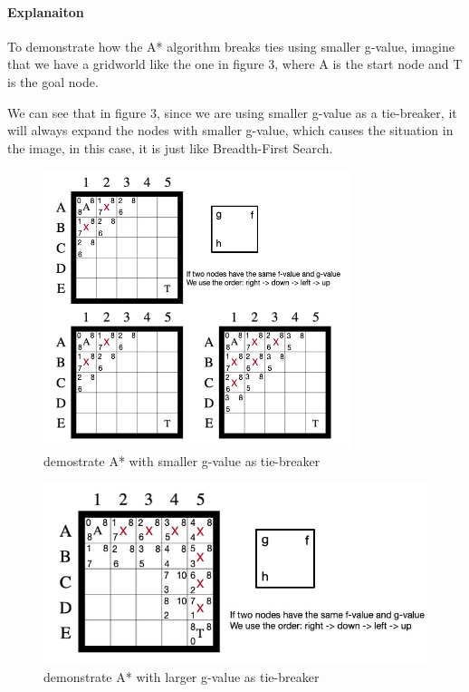 \documentclass[11pt]{report}
\begin{document}
\newpage


\paragraph{Explanaiton}
To demonstrate how the A* algorithm breaks ties using smaller g-value, imagine that we have a gridworld like the one in figure 3, where A is the start node and T is the goal node.

We can see that in figure 3, since we are using smaller g-value as a tie-breaker, it will always expand the nodes with smaller g-value, which causes the situation in the image, in this case, it is just like Breadth-First Search.


\begin{figure}[h]
\begin{center}
\includegraphics[width = 0.8\textwidth]{Part2_2.jpg} 
\end{center}
\caption{demostrate A* with smaller g-value as tie-breaker}
\end{figure}

\begin{figure}[t]
\begin{center}
\includegraphics[scale = 0.5]{Part2_3.jpg} 
\end{center}
\caption{demonstrate A* with larger g-value as tie-breaker}
\end{figure}
\end{document}
